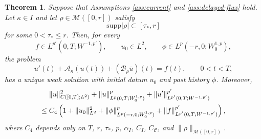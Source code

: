 \documentclass[a4paper,11pt,oneside,reqno]{amsart}
\newtheorem{theorem}{Theorem}[section]
\newcounter{c}
\newcounter{d}
\newcounter{b}
\newcommand{\supp}{\mathrm{supp}}
\newcommand{\M}{\mathcal{M}}
\begin{document}
\begin{theorem}\label{thm:separated-wp}
Suppose that Assumptions \ref{ass:current} and \ref{ass:delayed-flux} hold.
Let \(\kappa\in I\) and let \(\rho\in\M([0,r])\) satisfy
\[
 \supp|\rho|\subset[\tau_*,r]
\]
for some \(0<\tau_*\le r\).  Then, for every
\[
 f\in L^{p'}(0,T;W^{-1,p'}),\qquad
 u_0\in L^2,\qquad
 \phi\in L^p(-r,0;W^{1,p}_0),
\]
the problem
\begin{equation}
 u'(t)+\mathcal A_\kappa(u(t))+(\mathcal B_\rho\bar u)(t)=f(t),
 \qquad 0<t<T,
 \label{eq:separated-problem}
\end{equation}
has a unique weak solution with initial datum \(u_0\) and past history
\(\phi\).  Moreover,
\begin{align}
 &\|u\|_{C([0,T];L^2)}^2
 +\|u\|_{L^p(0,T;W^{1,p}_0)}^p
 +\|u'\|_{L^{p'}(0,T;W^{-1,p'})}^{p'}
 \notag\\
 \le{}&
 C_4\left(
 1+\|u_0\|_{L^2}^2
 +\|\phi\|_{L^p(-r,0;W^{1,p}_0)}^p
 +\|f\|_{L^{p'}(0,T;W^{-1,p'})}^{p'}
 \right),
 \label{eq:separated-estimate}
\end{align}
where \(C_4\) depends only on \(T\), \(r\), \(\tau_*\), \(p\),
\(\alpha_I\), \(C_I\), \(C_{\mathcal C}\), and
\(\|\rho\|_{\M([0,r])}\).
\end{theorem}
\end{document}
